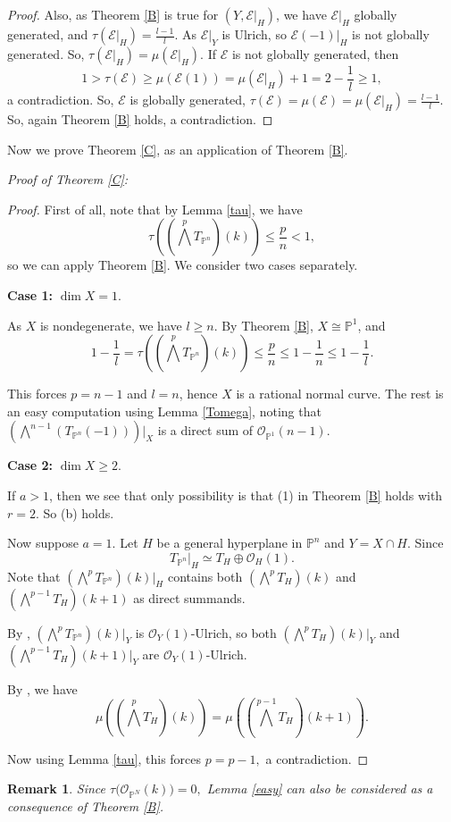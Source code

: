 \documentclass[11pt,letterpaper]{amsart}
\newtheorem{remark}[lemma]{Remark}
\begin{document}
\begin{proof}
Also, as Theorem \ref{B} is true for
$(Y,\mathcal E|_H)$, we have $\mathcal E|_H$ globally generated, and $\tau(\mathcal E|_H)=\frac{l-1}{l}.$ As $\mathcal E|_Y$ is Ulrich, so $\mathcal E(-1)|_H$ is not globally generated. So, $\tau(\mathcal E|_H)=\mu(\mathcal E|_H)$. If $\mathcal{E}$ is not globally generated, then $$1>\tau(\mathcal{E})\geq \mu(\mathcal E(1))=\mu(\mathcal E|_H)+1=2-\frac{1}{l}\geq 1,$$ a contradiction. So, $\mathcal{E}$ is globally generated, $\tau(\mathcal{E})=\mu(\mathcal{E})=\mu(\mathcal E|_H)=\frac{l-1}{l}.$ So, again Theorem \ref{B} holds, a contradiction.
\end{proof}
Now we prove Theorem \ref{C}, as an application of Theorem \ref{B}.

\textit{Proof of Theorem \ref{C}:}
\begin{proof}
First of all, note that by Lemma \ref{tau}, we have $$\tau\!\left(
\left(\bigwedge^p T_{\mathbb{P}^n}\right)(k)
\right)
\le
\frac{p}{n}<1,$$ so we can apply Theorem \ref{B}. We consider two cases separately.

\medskip

\noindent
\textbf{Case 1:} $\dim X=1$.

As $X$ is nondegenerate, we have $l\ge n$. By Theorem \ref{B},
$X\cong \mathbb{P}^1$, and
\[
1-\frac1l
=
\tau\!\left(
\left(\bigwedge^p T_{\mathbb{P}^n}\right)(k)
\right)
\le
\frac{p}{n}
\le
1-\frac1n
\le
1-\frac1l.
\]


This forces $p=n-1$ and $l=n$, hence $X$ is a rational normal curve. The rest is an easy computation using Lemma \ref{Tomega}, noting that $\left(\bigwedge^{n-1}(T_{\mathbb P^n}(-1))\right)\Big|_X$
is a direct sum of $\mathcal O_{\mathbb P^1}(n-1)$.

\medskip

\noindent
\textbf{Case 2:} $\dim X\ge 2$.

If $a>1$, then we see that only possibility is that (1) in Theorem \ref{B}
holds with $r=2$. So (b) holds.

Now suppose $a=1$. Let $H$ be a general hyperplane in
$\mathbb{P}^n$ and $Y=X\cap H$. Since
\[
T_{\mathbb{P}^n}|_H
\simeq
T_H\oplus \mathcal{O}_H(1).
\]
Note that $\left(\bigwedge^p T_{\mathbb{P}^n}\right)(k)\Big|_H$
contains both $
\left(\bigwedge^p T_H\right)(k)$
and $\left(\bigwedge^{p-1}T_H\right)(k+1)$
as direct summands.

By \cite[\S 2, (2.4)]{beauville2018introduction}, $\left(\bigwedge^p T_{\mathbb{P}^n}\right)(k)\Big|_Y$
is $\mathcal{O}_Y(1)$-Ulrich, so both $\left(\bigwedge^p T_H\right)(k)\Big|_Y$ and 
$\left(\bigwedge^{p-1}T_H\right)(k+1)\Big|_Y$
are $\mathcal{O}_Y(1)$-Ulrich.

By \cite[Lemma 2.4(iii)]{casanellas2012stable},
we have
\[
\mu\!\left(\left(\bigwedge^pT_H\right)(k)\right)
=
\mu\!\left(\left(\bigwedge^{p-1}T_H\right)(k+1)\right).
\]

Now using Lemma \ref{tau}, this forces $p=p-1,$
a contradiction.




\end{proof}
\begin{remark}
    Since $\tau\bigl(\mathcal{O}_{\mathbb{P}^N}(k)\bigr)=0,$ Lemma \ref{easy} can also be considered as a consequence of Theorem \ref{B}.
\end{remark}
\end{document}
